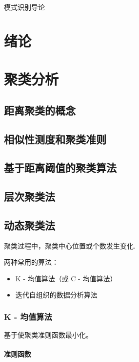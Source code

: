 \documentclass[11pt]{article}
\begin{document}
\color{fontcolor}{}
模式识别导论

\section{绪论}

\section{聚类分析}

\subsection{距离聚类的概念}

\subsection{相似性测度和聚类准则}

\subsection{基于距离阈值的聚类算法}

\subsection{层次聚类法}

\subsection{动态聚类法}

聚类过程中，聚类中心位置或个数发生变化.

两种常用的算法：
\begin{itemize}
	\item K - 均值算法（或 C - 均值算法）
	\item 迭代自组织的数据分析算法
\end{itemize}

\subsubsection{K - 均值算法}%
\label{ssub:k_jun_zhi_suan_fa_}

基于使聚类准则函数最小化。

\paragraph{准则函数}%
\label{par:zhun_ze_han_shu_}
\end{document}
